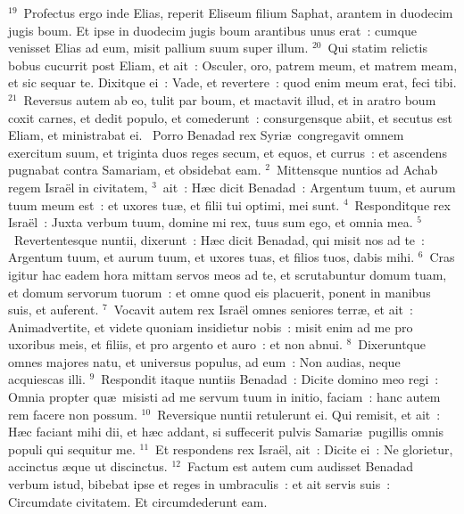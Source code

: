 ${}^{19}$~Profectus ergo inde Elias, reperit Eliseum filium Saphat, arantem in duodecim jugis boum. Et ipse in duodecim jugis boum arantibus unus erat~: cumque venisset Elias ad eum, misit pallium suum super illum.
${}^{20}$~Qui statim relictis bobus cucurrit post Eliam, et ait~: Osculer, oro, patrem meum, et matrem meam, et sic sequar te. Dixitque ei~: Vade, et revertere~: quod enim meum erat, feci tibi.
${}^{21}$~Reversus autem ab eo, tulit par boum, et mactavit illud, et in aratro boum coxit carnes, et dedit populo, et comederunt~: consurgensque abiit, et secutus est Eliam, et ministrabat ei.
~Porro Benadad rex Syri\ae\ congregavit omnem exercitum suum, et triginta duos reges secum, et equos, et currus~: et ascendens pugnabat contra Samariam, et obsidebat eam.
${}^{2}$~Mittensque nuntios ad Achab regem Isra\"el in civitatem,
${}^{3}$~ait~: H\ae c dicit Benadad~: Argentum tuum, et aurum tuum meum est~: et uxores tu\ae , et filii tui optimi, mei sunt.
${}^{4}$~Responditque rex Isra\"el~: Juxta verbum tuum, domine mi rex, tuus sum ego, et omnia mea.
${}^{5}$~Revertentesque nuntii, dixerunt~: H\ae c dicit Benadad, qui misit nos ad te~: Argentum tuum, et aurum tuum, et uxores tuas, et filios tuos, dabis mihi.
${}^{6}$~Cras igitur hac eadem hora mittam servos meos ad te, et scrutabuntur domum tuam, et domum servorum tuorum~: et omne quod eis placuerit, ponent in manibus suis, et auferent.
${}^{7}$~Vocavit autem rex Isra\"el omnes seniores terr\ae , et ait~: Animadvertite, et videte quoniam insidietur nobis~: misit enim ad me pro uxoribus meis, et filiis, et pro argento et auro~: et non abnui.
${}^{8}$~Dixeruntque omnes majores natu, et universus populus, ad eum~: Non audias, neque acquiescas illi.
${}^{9}$~Respondit itaque nuntiis Benadad~: Dicite domino meo regi~: Omnia propter qu\ae\ misisti ad me servum tuum in initio, faciam~: hanc autem rem facere non possum.
${}^{10}$~Reversique nuntii retulerunt ei. Qui remisit, et ait~: H\ae c faciant mihi dii, et h\ae c addant, si suffecerit pulvis Samari\ae\ pugillis omnis populi qui sequitur me.
${}^{11}$~Et respondens rex Isra\"el, ait~: Dicite ei~: Ne glorietur, accinctus \ae que ut discinctus.
${}^{12}$~Factum est autem cum audisset Benadad verbum istud, bibebat ipse et reges in umbraculis~: et ait servis suis~: Circumdate civitatem. Et circumdederunt eam.


